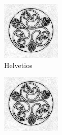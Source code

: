 \documentclass{article}
\begin{document}
	
%
\begin{figure}
\includegraphics[width=0.25\textwidth]{helvetios}
\caption{Helvetios}
\vspace{-5pt} %
\end{figure}

\lipsum[0-2]
	
\begin{figure}
	\includegraphics[width=0.25\textwidth]{helvetios}
\end{figure}

\lipsum[0-2]
\end{document}
